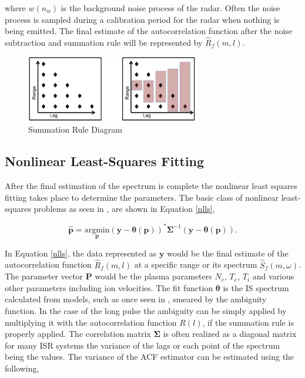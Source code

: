 \documentclass[draft,ras]{agutex}
\begin{document}
\begin{article}
\noindent where $w(n_w)$ is the background noise process of the radar.  Often the noise process is sampled during a calibration period for the radar when nothing is being emitted.  The final estimate of the autocorrelation function after the noise subtraction and summation rule will be represented by $\hat{R}_f(m,l)$.
\begin{figure}[!t]
\centering
\includegraphics[width=3in]{sumrule}
\caption{Summation Rule Diagram}
\label{fig:sumrule}
\end{figure}

\subsection{Nonlinear Least-Squares Fitting}
After the final estimation of the spectrum is complete the nonlinear least squares fitting takes place to determine the parameters.  The basic class of nonlinear least-squares problems as seen in \citep{kayvol1}, are shown in Equation \ref{nlls},

\begin{equation}
	\hat{\mathbf{p}}= \underset{\mathbf{p}}{\text{argmin}} (\mathbf{y}-\bm{\theta}(\mathbf{p}))^*\bm{\Sigma}^{-1}(\mathbf{y}-\bm{\theta}(\mathbf{p})).
\label{nlls}
\end{equation}

In Equation \ref{nlls}, the data represented as $\mathbf{y}$ would be the final estimate of the autocorrelation function $\hat{R}_f(m,l)$ at a specific range or its spectrum $\hat{S}_f(m,\omega)$.  The parameter vector $\mathbf{P}$ would be the plasma parameters $N_e$, $T_e$, $T_i$ and various other parameters including ion velocities. The fit function $\bm{\theta}$ is the IS spectrum calculated from models, such as once seen in \citep{kudeki:milla:1}, smeared by the ambiguity function.  In the case of the long pulse the ambiguity can be simply applied by multiplying it with the autocorrelation function $R(l)$, if the summation rule is properly applied. The correlation matrix $\bm{\Sigma}$ is often realized as a diagonal matrix for many ISR systems the variance of the lags or each point of the spectrum being the values. The variance of the ACF estimator can be estimated using the following,


\end{article}
\end{document}
